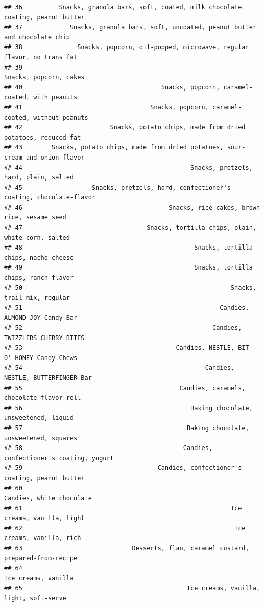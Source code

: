 \documentclass[
]{article}
\begin{document}
\begin{verbatim}
## 36          Snacks, granola bars, soft, coated, milk chocolate coating, peanut butter
## 37             Snacks, granola bars, soft, uncoated, peanut butter and chocolate chip
## 38               Snacks, popcorn, oil-popped, microwave, regular flavor, no trans fat
## 39                                                             Snacks, popcorn, cakes
## 40                                      Snacks, popcorn, caramel-coated, with peanuts
## 41                                   Snacks, popcorn, caramel-coated, without peanuts
## 42                        Snacks, potato chips, made from dried potatoes, reduced fat
## 43        Snacks, potato chips, made from dried potatoes, sour-cream and onion-flavor
## 44                                              Snacks, pretzels, hard, plain, salted
## 45                   Snacks, pretzels, hard, confectioner's coating, chocolate-flavor
## 46                                        Snacks, rice cakes, brown rice, sesame seed
## 47                                  Snacks, tortilla chips, plain, white corn, salted
## 48                                               Snacks, tortilla chips, nacho cheese
## 49                                               Snacks, tortilla chips, ranch-flavor
## 50                                                         Snacks, trail mix, regular
## 51                                                      Candies, ALMOND JOY Candy Bar
## 52                                                    Candies, TWIZZLERS CHERRY BITES
## 53                                          Candies, NESTLE, BIT-O'-HONEY Candy Chews
## 54                                                  Candies, NESTLE, BUTTERFINGER Bar
## 55                                           Candies, caramels, chocolate-flavor roll
## 56                                              Baking chocolate, unsweetened, liquid
## 57                                             Baking chocolate, unsweetened, squares
## 58                                            Candies, confectioner's coating, yogurt
## 59                                     Candies, confectioner's coating, peanut butter
## 60                                                           Candies, white chocolate
## 61                                                         Ice creams, vanilla, light
## 62                                                          Ice creams, vanilla, rich
## 63                              Desserts, flan, caramel custard, prepared-from-recipe
## 64                                                                Ice creams, vanilla
## 65                                             Ice creams, vanilla, light, soft-serve

\end{verbatim}
\end{document}
